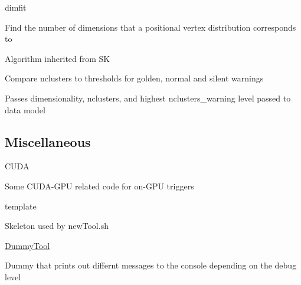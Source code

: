 \begin{DoxyItemize}
\item dimfit
\begin{DoxyItemize}
\item Find the number of dimensions that a positional vertex distribution corresponds to
\item Algorithm inherited from S\-K
\item Compare nclusters to thresholds for golden, normal and silent warnings
\item Passes dimensionality, nclusters, and highest nclusters\-\_\-warning level passed to data model
\end{DoxyItemize}
\end{DoxyItemize}

\subsection*{Miscellaneous}


\begin{DoxyItemize}
\item C\-U\-D\-A
\begin{DoxyItemize}
\item Some C\-U\-D\-A-\/\-G\-P\-U related code for on-\/\-G\-P\-U triggers
\end{DoxyItemize}
\item template
\begin{DoxyItemize}
\item Skeleton used by {\ttfamily new\-Tool.\-sh}
\end{DoxyItemize}
\item \hyperlink{classDummyTool}{Dummy\-Tool}
\begin{DoxyItemize}
\item Dummy that prints out differnt messages to the console depending on the debug level 
\end{DoxyItemize}
\end{DoxyItemize}